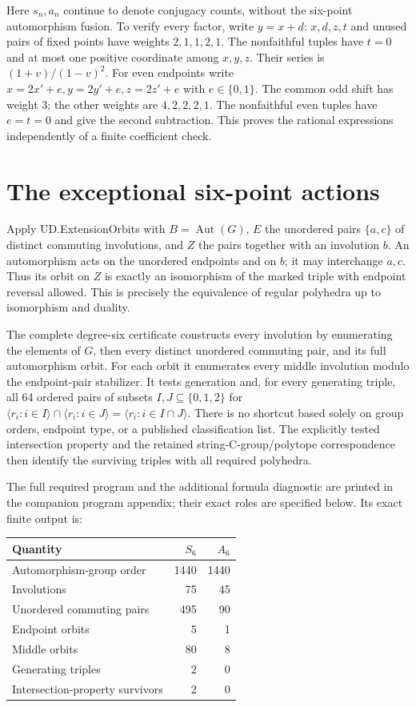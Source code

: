 Here \(s_n,a_n\) continue to denote conjugacy counts, without the
six-point automorphism fusion. To verify every factor, write \(y=x+d\):
\(x,d,z,t\) and unused pairs of fixed points have weights \(2,1,1,2,1\).
The nonfaithful tuples have \(t=0\) and at most one positive coordinate
among \(x,y,z\). Their series is \((1+v)/(1-v)^2\). For even endpoints
write \(x=2x'+e,y=2y'+e,z=2z'+e\) with \(e\in\{0,1\}\). The common odd
shift has weight 3; the other weights are \(4,2,2,2,1\). The nonfaithful
even tuples have \(e=t=0\) and give the second subtraction. This proves
the rational expressions independently of a finite coefficient check.

\section{The exceptional six-point
actions}\label{the-exceptional-six-point-actions}

Apply UD.ExtensionOrbits with \(B=\operatorname{Aut}(G)\), \(E\) the
unordered pairs \(\{a,c\}\) of distinct commuting involutions, and \(Z\)
the pairs together with an involution \(b\). An automorphism acts on the
unordered endpoints and on \(b\); it may interchange \(a,c\). Thus its
orbit on \(Z\) is exactly an isomorphism of the marked triple with
endpoint reversal allowed. This is precisely the equivalence of regular
polyhedra up to isomorphism and duality.

The complete degree-six certificate constructs every involution by
enumerating the elements of \(G\), then every distinct unordered
commuting pair, and its full automorphism orbit. For each orbit it
enumerates every middle involution modulo the endpoint-pair stabilizer.
It tests generation and, for every generating triple, all 64 ordered
pairs of subsets \(I,J\subseteq\{0,1,2\}\) for
\(\langle r_i:i\in I\rangle\cap\langle r_i:i\in J\rangle=\langle r_i:i\in I\cap J\rangle\).
There is no shortcut based solely on group orders, endpoint type, or a
published classification list. The explicitly tested intersection
property and the retained string-C-group/polytope correspondence then
identify the surviving triples with all required polyhedra.

The full required program and the additional formula diagnostic are
printed in the companion program appendix; their exact roles are
specified below. Its exact finite output is:

{
\begin{longtable}[]{@{}lrr@{}}
\toprule\noalign{}
Quantity & \(S_6\) & \(A_6\) \\
\midrule\noalign{}
\endhead
\bottomrule\noalign{}
\endlastfoot
Automorphism-group order & 1440 & 1440 \\
Involutions & 75 & 45 \\
Unordered commuting pairs & 495 & 90 \\
Endpoint orbits & 5 & 1 \\
Middle orbits & 80 & 8 \\
Generating triples & 2 & 0 \\
Intersection-property survivors & 2 & 0 \\
\end{longtable}
}

